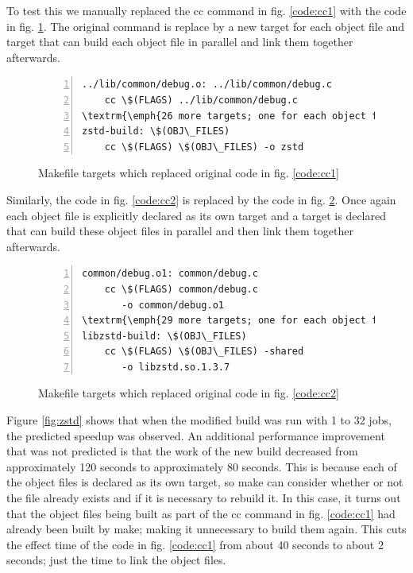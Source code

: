 \documentclass[sigconf,10pt,authorversion]{acmart}\settopmatter{printfolios=true,printccs=false,printacmref=false}
\begin{document}
To test this we manually replaced the cc command in fig. \ref{code:cc1} with the code in fig.
\ref{code:cc3}.  The original command is replace by a new target for each object file and target
that can build each object file in parallel and link them together afterwards.

\begin{figure}[H]
\begin{Verbatim}[commandchars=\\\{\},codes={\catcode`$=3\catcode`^=7\catcode`_=8},fontsize=\small,numbers=left,xleftmargin=5mm]
../lib/common/debug.o: ../lib/common/debug.c                                                       
    cc \$(FLAGS) ../lib/common/debug.c
\textrm{\emph{26 more targets; one for each object file}}    
zstd-build: \$(OBJ\_FILES)
    cc \$(FLAGS) \$(OBJ\_FILES) -o zstd
\end{Verbatim}
\caption{Makefile targets which replaced original code in fig. \ref{code:cc1}}
\label{code:cc3}
\end{figure}

Similarly, the code in fig. \ref{code:cc2} is replaced by the code in fig. \ref{code:cc4}.  Once
again each object file is explicitly declared as its own target and a target is declared that can
build these object files in parallel and then link them together afterwards.

\begin{figure}[H]
  \begin{Verbatim}[commandchars=\\\{\},codes={\catcode`$=3\catcode`^=7\catcode`_=8},fontsize=\small,numbers=left,xleftmargin=5mm]
common/debug.o1: common/debug.c
    cc \$(FLAGS) common/debug.c
       -o common/debug.o1
\textrm{\emph{29 more targets; one for each object file}}
libzstd-build: \$(OBJ\_FILES)
    cc \$(FLAGS) \$(OBJ\_FILES) -shared
       -o libzstd.so.1.3.7
\end{Verbatim}
\caption{Makefile targets which replaced original code in fig. \ref{code:cc2}}
\label{code:cc4}
\end{figure}

Figure \ref{fig:zstd} shows that when the modified build was run with 1 to 32 jobs,
the predicted speedup was observed.  An additional performance improvement that was not predicted
is that the work of the new build decreased from approximately 120 seconds to approximately 80 seconds.
This is because each of the object files is declared as its own target, so make can consider whether
or not the file already exists and if it is necessary to rebuild it.  In this case, it turns out that
the object files being built as part of the cc command in fig. \ref{code:cc1} had already been built
by make; making it unnecessary to build them again.  This cuts the effect time of the code in fig.
\ref{code:cc1} from about 40 seconds to about 2 seconds; just the time to link the object files.
\end{document}
